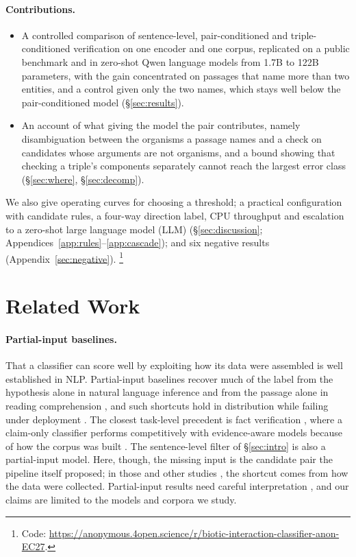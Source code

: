 \documentclass[11pt]{article}
\begin{document}
\paragraph{Contributions.}
\begin{itemize}\itemsep1pt\parskip0pt
\item A controlled comparison of sentence-level, pair-conditioned and triple-conditioned
      verification on one encoder and one corpus, replicated on a public benchmark and in zero-shot
      Qwen language models from 1.7B to 122B parameters, with the gain concentrated on passages that name
      more than two entities, and a control given only the two names, which stays well below the
      pair-conditioned model (\S\ref{sec:results}).
\item An account of what giving the model the pair contributes, namely disambiguation between the organisms a passage
      names and a check on candidates whose arguments are not organisms, and a bound showing that
      checking a triple's components separately cannot reach the largest error class
      (\S\ref{sec:where}, \S\ref{sec:decomp}).
\end{itemize}
We also give operating curves for choosing a threshold; a practical configuration with
candidate rules, a four-way direction label, CPU throughput and escalation to a zero-shot large
language model (LLM) (\S\ref{sec:discussion}; Appendices~\ref{app:rules}--\ref{app:cascade}); and six negative results
(Appendix~\ref{sec:negative}).%
\footnote{Code: \url{https://anonymous.4open.science/r/biotic-interaction-classifier-anon-EC27}.}

\section{Related Work}
\label{sec:related}

\paragraph{Partial-input baselines.}
That a classifier can score well by exploiting how its data were assembled is well established in
NLP. Partial-input baselines recover much of the label from the hypothesis alone in natural language
inference
\citep{gururangan-etal-2018-annotation,poliak-etal-2018-hypothesis} and from the passage alone in
reading comprehension \citep{kaushik-lipton-2018-much}, and such shortcuts hold in distribution while
failing under deployment \citep{geirhos-etal-2020-shortcut,du-etal-2024-shortcut}. The closest
task-level precedent is fact verification \citep{thorne2018fever}, where a claim-only classifier
performs competitively with evidence-aware models because of how the corpus was built
\citep{schuster-etal-2019-towards}. The sentence-level filter of \S\ref{sec:intro} is also a
partial-input model. Here, though, the missing input is the candidate pair the pipeline itself proposed; in those
and other studies \citep{wiegand-etal-2019-detection,parmar-etal-2023-dont}, the shortcut comes
from how the data were collected. Partial-input results need careful
interpretation \citep{feng-etal-2019-misleading}, and our claims are limited to the models and corpora we study.
\end{document}
